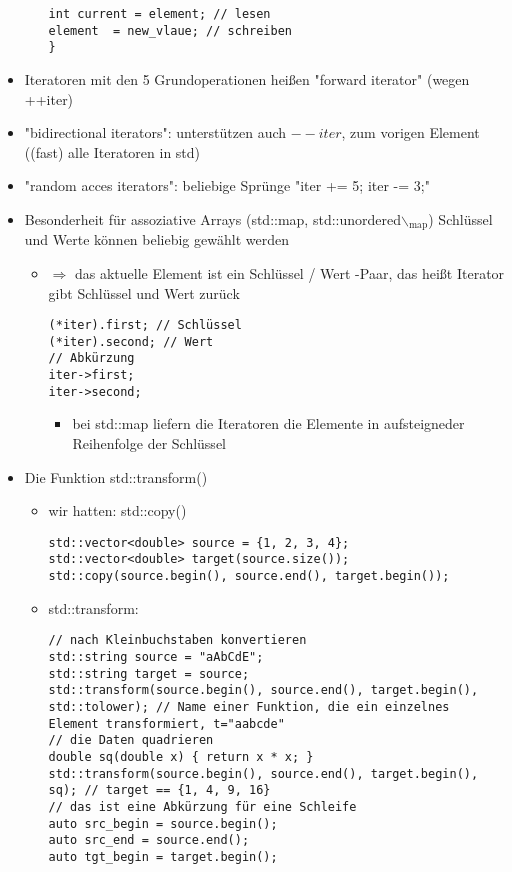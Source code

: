 \documentclass[a4paper]{scrartcl}
\begin{document}
\begin{itemize}
\begin{itemize}
\begin{verbatim}
int current = element; // lesen
element  = new_vlaue; // schreiben
}
\end{verbatim}
\end{itemize}
\item Iteratoren mit den 5 Grundoperationen heißen "forward iterator" (wegen ++iter)
\item "bidirectional iterators": unterstützen auch $--iter$, zum vorigen Element ((fast) alle Iteratoren in std)
\item "random acces iterators": beliebige Sprünge "iter += 5; iter -= 3;"
\item Besonderheit für assoziative Arrays (std::map, std::unordered$\backslash$$_{\text{map}}$)
Schlüssel und Werte können beliebig gewählt werden
\begin{itemize}
\item $\Rightarrow$ das aktuelle Element ist ein Schlüssel / Wert -Paar, das heißt Iterator gibt Schlüssel und Wert zurück
\begin{verbatim}
(*iter).first; // Schlüssel
(*iter).second; // Wert
// Abkürzung
iter->first;
iter->second;
\end{verbatim}
\begin{itemize}
\item bei std::map liefern die Iteratoren die Elemente in aufsteigneder Reihenfolge der Schlüssel
\end{itemize}
\end{itemize}
\item Die Funktion std::transform()
\begin{itemize}
\item wir hatten: std::copy()
\begin{verbatim}
std::vector<double> source = {1, 2, 3, 4};
std::vector<double> target(source.size());
std::copy(source.begin(), source.end(), target.begin());
\end{verbatim}
\item std::transform:
\begin{verbatim}
// nach Kleinbuchstaben konvertieren
std::string source = "aAbCdE";
std::string target = source;
std::transform(source.begin(), source.end(), target.begin(), std::tolower); // Name einer Funktion, die ein einzelnes Element transformiert, t="aabcde"
// die Daten quadrieren
double sq(double x) { return x * x; }
std::transform(source.begin(), source.end(), target.begin(), sq); // target == {1, 4, 9, 16}
// das ist eine Abkürzung für eine Schleife
auto src_begin = source.begin();
auto src_end = source.end();
auto tgt_begin = target.begin();


\end{verbatim}
\end{itemize}$$
\end{itemize}
\end{document}

